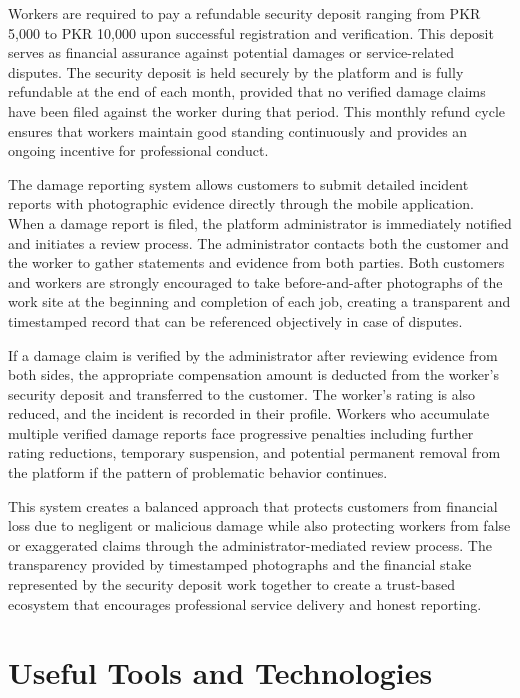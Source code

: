 \documentclass[12pt,a4paper]{report}
\begin{document}
Workers are required to pay a refundable security deposit ranging from PKR 5,000 to PKR 10,000 upon successful registration and verification. This deposit serves as financial assurance against potential damages or service-related disputes. The security deposit is held securely by the platform and is fully refundable at the end of each month, provided that no verified damage claims have been filed against the worker during that period. This monthly refund cycle ensures that workers maintain good standing continuously and provides an ongoing incentive for professional conduct.

The damage reporting system allows customers to submit detailed incident reports with photographic evidence directly through the mobile application. When a damage report is filed, the platform administrator is immediately notified and initiates a review process. The administrator contacts both the customer and the worker to gather statements and evidence from both parties. Both customers and workers are strongly encouraged to take before-and-after photographs of the work site at the beginning and completion of each job, creating a transparent and timestamped record that can be referenced objectively in case of disputes.

If a damage claim is verified by the administrator after reviewing evidence from both sides, the appropriate compensation amount is deducted from the worker's security deposit and transferred to the customer. The worker's rating is also reduced, and the incident is recorded in their profile. Workers who accumulate multiple verified damage reports face progressive penalties including further rating reductions, temporary suspension, and potential permanent removal from the platform if the pattern of problematic behavior continues.

This system creates a balanced approach that protects customers from financial loss due to negligent or malicious damage while also protecting workers from false or exaggerated claims through the administrator-mediated review process. The transparency provided by timestamped photographs and the financial stake represented by the security deposit work together to create a trust-based ecosystem that encourages professional service delivery and honest reporting.

\section{Useful Tools and Technologies}
\end{document}
